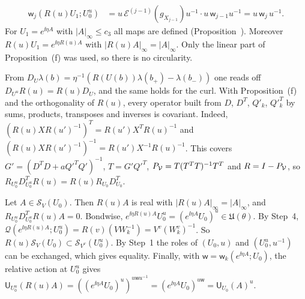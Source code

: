 \begin{detail}
\begin{step}
\[\begin{aligned}
\mathsf w_j(R(u)U_1;U_0^u)&=u\,\mathcal E^{(j-1)}(g_{X_{j-1}})u^{-1}\cdot u\,\mathsf w_{j-1}u^{-1}=u\,\mathsf w_j\,u^{-1}.
\end{aligned}
\]
For $U_1=e^{\ii\eta A}$ with $|A|_\infty\le c_3$ all maps are defined (Proposition~). Moreover $R(u)U_1=e^{\ii\eta R(u)A}$ with $|R(u)A|_\infty=|A|_\infty$. Only the linear part of Proposition~(f) was used, so there is no circularity.
\end{step}
\begin{step}
From $D_U\lambda(b)=\eta^{-1}(R(U(b))\lambda(b_+)-\lambda(b_-))$ one reads off $D_{U^u}R(u)=R(u)D_U$, and the same holds for the curl. With Proposition~(f) and the orthogonality of $R(u)$, every operator built from $D$, $D^T$, $Q'_k$, $Q'^T_k$ by sums, products, transposes and inverses is covariant. Indeed, $(R(u)XR(u')^{-1})^T=R(u')X^TR(u)^{-1}$ and $(R(u)XR(u')^{-1})^{-1}=R(u')X^{-1}R(u)^{-1}$. This covers $G'=(D^TD+aQ'^TQ')^{-1}$, $T=G'Q'^T$, $P_\mathcal V=T(T^TT)^{-1}T^T$ and $R=I-P_\mathcal V$, so $R_{U_0^u}D^T_{U_0^u}R(u)=R(u)R_{U_0}D^T_{U_0}$.
\end{step}
\begin{step}
Let $A\in\mathcal S_V(U_0)$. Then $R(u)A$ is real with $|R(u)A|_\infty=|A|_\infty$, and $R_{U_0^u}D^T_{U_0^u}R(u)A=0$. Bondwise, $e^{\ii\eta R(u)A}U_0^u=(e^{\ii\eta A}U_0)^u\in\mathfrak U(\theta)$. By Step~4, $\mathcal Q(e^{\ii\eta R(u)A};U_0^u)=R(v)(VW_k^{-1})=V^v(W_k^v)^{-1}$. So $R(u)\mathcal S_V(U_0)\subset\mathcal S_{V^v}(U_0^u)$. By Step~1 the roles of $(U_0,u)$ and $(U_0^u,u^{-1})$ can be exchanged, which gives equality. Finally, with $\mathsf w=\mathsf w_k(e^{\ii\eta A};U_0)$, the relative action at $U_0^u$ gives $\mathsf U_{U_0^u}(R(u)A)=((e^{\ii\eta A}U_0)^u)^{u\mathsf wu^{-1}}=(e^{\ii\eta A}U_0)^{u\mathsf w}=\mathsf U_{U_0}(A)^u$.
\end{step}
\end{detail}

